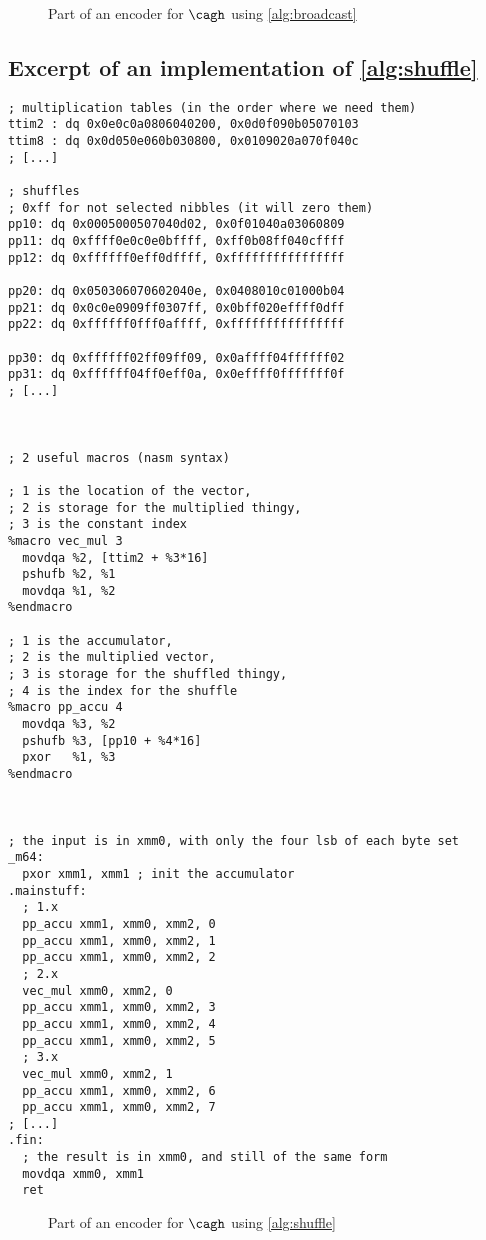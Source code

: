 \begin{figure}[!htb]
\caption{Part of an encoder for $\cagh$ using \autoref{alg:broadcast}}
\end{figure}  


\FloatBarrier

\subsection{Excerpt of an implementation of \autoref{alg:shuffle}}
\label{app:spec}
\begin{verbatim}
; multiplication tables (in the order where we need them)
ttim2 : dq 0x0e0c0a0806040200, 0x0d0f090b05070103
ttim8 : dq 0x0d050e060b030800, 0x0109020a070f040c
; [...]

; shuffles
; 0xff for not selected nibbles (it will zero them)
pp10: dq 0x0005000507040d02, 0x0f01040a03060809
pp11: dq 0xffff0e0c0e0bffff, 0xff0b08ff040cffff 
pp12: dq 0xffffff0eff0dffff, 0xffffffffffffffff

pp20: dq 0x050306070602040e, 0x0408010c01000b04
pp21: dq 0x0c0e0909ff0307ff, 0x0bff020effff0dff
pp22: dq 0xffffff0fff0affff, 0xffffffffffffffff

pp30: dq 0xffffff02ff09ff09, 0x0affff04ffffff02
pp31: dq 0xffffff04ff0eff0a, 0x0effff0fffffff0f
; [...]



; 2 useful macros (nasm syntax)

; 1 is the location of the vector,
; 2 is storage for the multiplied thingy,
; 3 is the constant index
%macro vec_mul 3
  movdqa %2, [ttim2 + %3*16]
  pshufb %2, %1
  movdqa %1, %2
%endmacro

; 1 is the accumulator,
; 2 is the multiplied vector,
; 3 is storage for the shuffled thingy,
; 4 is the index for the shuffle
%macro pp_accu 4
  movdqa %3, %2
  pshufb %3, [pp10 + %4*16]
  pxor   %1, %3
%endmacro



; the input is in xmm0, with only the four lsb of each byte set
_m64:
  pxor xmm1, xmm1 ; init the accumulator
.mainstuff:
  ; 1.x
  pp_accu xmm1, xmm0, xmm2, 0
  pp_accu xmm1, xmm0, xmm2, 1
  pp_accu xmm1, xmm0, xmm2, 2
  ; 2.x
  vec_mul xmm0, xmm2, 0
  pp_accu xmm1, xmm0, xmm2, 3
  pp_accu xmm1, xmm0, xmm2, 4
  pp_accu xmm1, xmm0, xmm2, 5
  ; 3.x
  vec_mul xmm0, xmm2, 1
  pp_accu xmm1, xmm0, xmm2, 6
  pp_accu xmm1, xmm0, xmm2, 7
; [...]
.fin:
  ; the result is in xmm0, and still of the same form
  movdqa xmm0, xmm1
  ret
\end{verbatim}
\begin{figure}[!htb]
\caption{Part of an encoder for $\cagh$ using \autoref{alg:shuffle}}
\end{figure}

\renewcommand\thesection{\arabic{section}}
